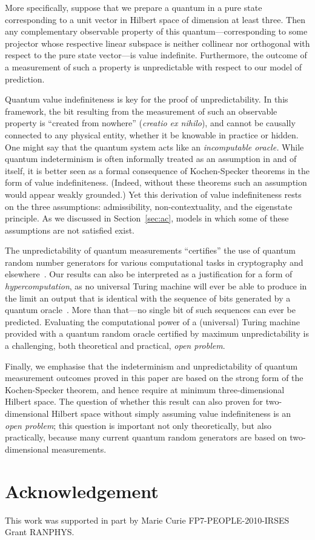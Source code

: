 \documentclass[%
 superscriptaddress,
 preprint,
 showpacs,
 showkeys,
 preprintnumbers,
  amsmath,amssymb,
  aps,
 pra,
  longbibliography,
  floatfix,
 ]{revtex4-1}
\theoremstyle{definition}
\begin{document}
More specifically,  suppose that we prepare a quantum in a pure state corresponding to a unit vector in Hilbert space of dimension at least three.
Then any complementary observable property of this quantum---corresponding to some projector whose respective linear subspace is neither collinear nor orthogonal with respect to the pure state vector---is value indefinite.
Furthermore,  the outcome of a measurement of such a property is unpredictable with respect to our model of prediction.

Quantum value indefiniteness is key for the proof of unpredictability.
In this framework, the bit resulting from the measurement of such an observable property is ``created from nowhere'' (\emph{creatio ex nihilo}), and cannot be causally connected to any physical entity, whether it be knowable in practice or hidden.
One might say that the quantum system acts like an {\em incomputable oracle.}
While quantum indeterminism is often informally treated as an assumption in and of itself, it is better seen as a formal consequence of Kochen-Specker theorems in the form of value indefiniteness.
(Indeed, without these theorems such an assumption would appear weakly grounded.)
Yet this derivation of value indefiniteness rests on the three assumptions: admissibility, non-contextuality, and the eigenstate principle.
As we discussed in Section~\ref{sec:ac}, models in which some of these assumptions are not satisfied exist.

The unpredictability of quantum measurements ``certifies'' the use of quantum random number generators for various computational tasks in cryptography and elsewhere~\cite{svozil-qct,stefanov-2000,10.1038/nature09008}.
Our results can also be interpreted as a justification for a form of  {\em hypercomputation}, as no universal Turing machine will ever be able to produce in the limit an output that is identical with the sequence of bits generated by a quantum oracle~\cite{qrand-oracle}.
More than that---no single bit of such sequences can ever be predicted. 
Evaluating the computational power of a (universal) Turing machine provided with a quantum random oracle certified by maximum unpredictability is a challenging, both theoretical and practical, {\it open problem}.

Finally, we  emphasise that the indeterminism and unpredictability of quantum measurement outcomes proved in this paper are based on the  strong form of the Kochen-Specker theorem, and hence require at minimum three-dimensional Hilbert space.
The question of whether this result can also proven for two-dimensional Hilbert space without simply assuming value indefiniteness is an \emph{open problem};
this question is important not only theoretically, but also practically, because many current quantum random generators are based on two-dimensional  measurements.

\section*{Acknowledgement} This work was supported in part by Marie Curie FP7-PEOPLE-2010-IRSES Grant RANPHYS.


\end{document}
